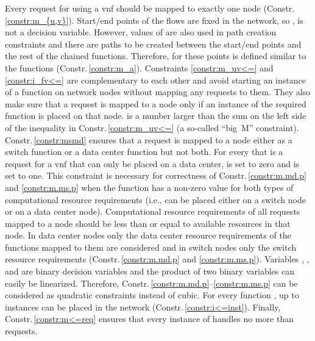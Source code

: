 \documentclass[10pt,a4paper,conference]{IEEEtran}
\begin{document}
{\footnotesize

}Every request for using a \ac{vnf} should be mapped to exactly one node (Constr.\,\ref{constr:m_{u,v}}). Start/end points
of the flows are fixed in the network, so , 
is not a decision variable. However, values of  are also used in path creation 
constraints and there are paths to be created between the start/end points and 
the rest of the chained functions. Therefore, for these points  is defined 
similar to the functions (Constr.\,\ref{constr:m_a}). Constraints \ref{constr:m_uv<=}
and \ref{constr:i_fv<=} are complementary to each other and avoid starting an
instance of a function on network nodes without mapping any requests to them. They
also make sure that a request is mapped to a node only if an instance of the 
required function is placed on that node.  is a 
number larger than the sum on the left side of the inequality in Constr.\,\ref{constr:m_uv<=}
(a so-called ``big~M'' constraint). Constr.\,\ref{constr:msmd} ensures that a request is mapped to a node 
either as a switch function or a data center function but not both. For every 
 that is a request for a \ac{vnf} that can only be placed on a data center, 
 is set to zero and  is set to one. 
This constraint is necessary for correctness of Constr.\,\ref{constr:m.md.p} and \ref{constr:m.ms.p} when the function has a non-zero value for both types of 
computational resource requirements (i.e., can be placed either on a switch node 
or on a data center node). Computational resource requirements of all requests 
mapped to a node should be less than or equal to available resources in that node.
In data center nodes only the data center resource requirements of the functions 
mapped to them are considered and in switch nodes only the switch resource 
requirements (Constr.\,\ref{constr:m.md.p} and \ref{constr:m.ms.p}).
Variables , , and  are binary decision variables
and the product of two binary variables can easily be linearized. Therefore, 
Constr.\,\ref{constr:m.md.p}--\ref{constr:m.ms.p} can be considered as quadratic 
constraints instead of cubic. For every
function , up to  instances can be placed in the network
(Constr.\,\ref{constr:i<=inst}). Finally, Constr.\,\ref{constr:m<=req} ensures
that every instance of  handles no more than  requests.
\end{document}
